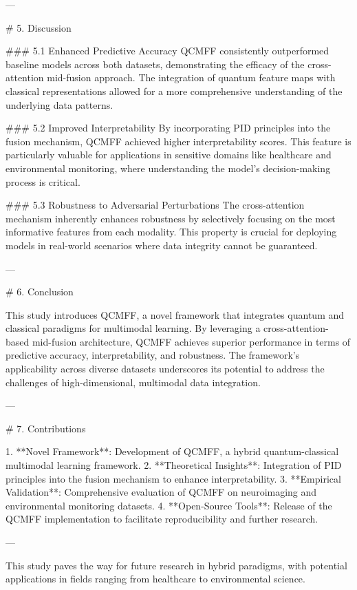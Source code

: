 ---

# 5. Discussion

### 5.1 Enhanced Predictive Accuracy
QCMFF consistently outperformed baseline models across both datasets, demonstrating the efficacy of the cross-attention mid-fusion approach. The integration of quantum feature maps with classical representations allowed for a more comprehensive understanding of the underlying data patterns.

### 5.2 Improved Interpretability
By incorporating PID principles into the fusion mechanism, QCMFF achieved higher interpretability scores. This feature is particularly valuable for applications in sensitive domains like healthcare and environmental monitoring, where understanding the model's decision-making process is critical.

### 5.3 Robustness to Adversarial Perturbations
The cross-attention mechanism inherently enhances robustness by selectively focusing on the most informative features from each modality. This property is crucial for deploying models in real-world scenarios where data integrity cannot be guaranteed.

---

# 6. Conclusion

This study introduces QCMFF, a novel framework that integrates quantum and classical paradigms for multimodal learning. By leveraging a cross-attention-based mid-fusion architecture, QCMFF achieves superior performance in terms of predictive accuracy, interpretability, and robustness. The framework's applicability across diverse datasets underscores its potential to address the challenges of high-dimensional, multimodal data integration.

---

# 7. Contributions

1. **Novel Framework**: Development of QCMFF, a hybrid quantum-classical multimodal learning framework.
2. **Theoretical Insights**: Integration of PID principles into the fusion mechanism to enhance interpretability.
3. **Empirical Validation**: Comprehensive evaluation of QCMFF on neuroimaging and environmental monitoring datasets.
4. **Open-Source Tools**: Release of the QCMFF implementation to facilitate reproducibility and further research.

---

This study paves the way for future research in hybrid paradigms, with potential applications in fields ranging from healthcare to environmental science.
